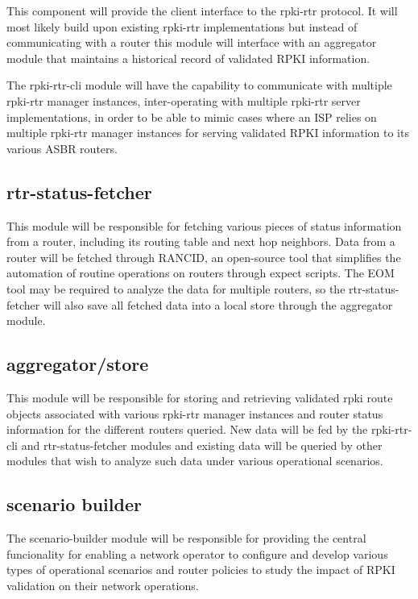 This component will provide the client interface to the rpki-rtr
protocol.  It will most likely build upon existing rpki-rtr
implementations but instead of communicating with a router this
module will interface with an aggregator module that maintains a
historical record of validated RPKI information.

The rpki-rtr-cli module will have the capability to communicate with
multiple rpki-rtr manager instances, inter-operating with multiple 
rpki-rtr server implementations, in order to be able to mimic cases 
where an ISP relies on multiple rpki-rtr manager instances for serving
validated RPKI information to its various ASBR routers.

\subsection{rtr-status-fetcher}

This module will be responsible for fetching various pieces of status
information from a router, including its routing table and next hop
neighbors. Data from a router will be fetched through RANCID, an open-source
tool that simplifies the automation of routine operations on routers
through expect scripts. The EOM tool may be required to analyze the data
for multiple routers, so the rtr-status-fetcher will also save all fetched
data into a local store through the aggregator module. 

\subsection{aggregator/store}

This module will be responsible for storing and retrieving validated
rpki route objects associated with various rpki-rtr manager instances
and router status information for the different routers queried.
New data will be fed by the rpki-rtr-cli and rtr-status-fetcher
modules and existing data will be queried by other modules that wish to
analyze such data under various operational scenarios. 

\subsection{scenario builder}

The scenario-builder module will be responsible for providing the
central funcionality for enabling a network operator to configure and
develop various types of operational scenarios and router policies to
study the impact of RPKI validation on their network operations. 

